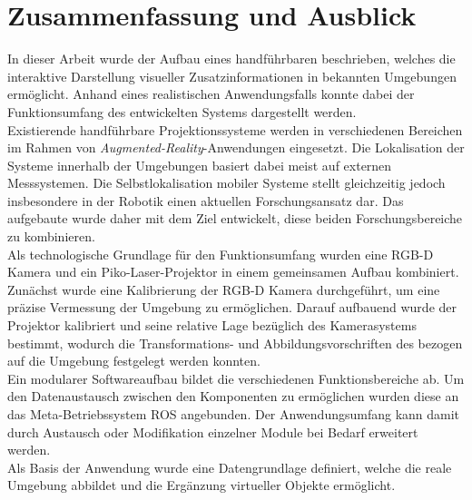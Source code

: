 \chapter{Zusammenfassung und Ausblick}
\label{chap.zusammenfassung}

In dieser Arbeit wurde der Aufbau eines handführbaren \kps{} beschrieben, welches die interaktive Darstellung visueller Zusatzinformationen in bekannten Umgebungen ermöglicht. Anhand eines realistischen Anwendungsfalls konnte dabei der Funktionsumfang des entwickelten Systems dargestellt werden.\\
Existierende handführbare Projektionssysteme werden in verschiedenen Bereichen im Rahmen von \textit{Augmented-Reality}-Anwendungen eingesetzt. Die Lokalisation der Systeme innerhalb der Umgebungen basiert dabei meist auf externen Messsystemen. Die Selbstlokalisation mobiler Systeme stellt gleichzeitig jedoch insbesondere in der Robotik einen aktuellen Forschungsansatz dar. Das aufgebaute \kps{} wurde daher mit dem Ziel entwickelt, diese beiden Forschungsbereiche zu kombinieren.\\

Als technologische Grundlage für den Funktionsumfang wurden eine RGB-D Kamera und ein Piko-Laser-Projektor in einem gemeinsamen Aufbau kombiniert. Zunächst wurde eine Kalibrierung der RGB-D Kamera durchgeführt, um eine präzise Vermessung der Umgebung zu ermöglichen. Darauf aufbauend wurde der Projektor kalibriert und seine relative Lage bezüglich des Kamerasystems bestimmt, wodurch die Transformations- und Abbildungsvorschriften des  bezogen auf die Umgebung festgelegt werden konnten.\\

Ein modularer Softwareaufbau bildet die verschiedenen Funktionsbereiche ab. Um den Datenaustausch zwischen den Komponenten zu ermöglichen wurden diese an das Meta-Betriebssystem ROS angebunden. Der Anwendungsumfang kann damit durch Austausch oder Modifikation einzelner Module bei Bedarf erweitert werden.\\
Als Basis der Anwendung wurde eine Datengrundlage definiert, welche die reale Umgebung abbildet und die Ergänzung virtueller Objekte ermöglicht. \\
 
